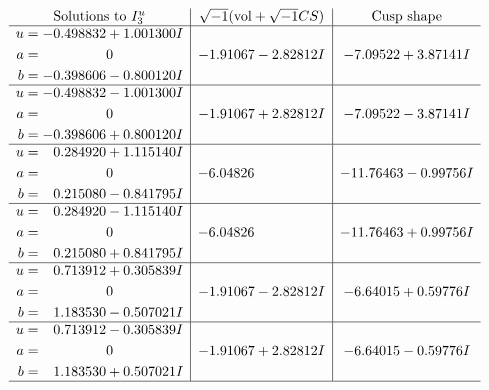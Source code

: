 \documentclass[1p]{elsarticle_modified}
\theoremstyle{definition}
\newcommand{\I}{\sqrt{-1}}
\begin{document}
$$\begin{array}{c|c|c}  
\text{Solutions to }I^u_{3}& \I (\text{vol} + \sqrt{-1}CS) & \text{Cusp shape}\\
 \hline 
\begin{aligned}
u &= -0.498832 + 1.001300 I \\
a &= \phantom{-0.000000 } 0 \\
b &= -0.398606 - 0.800120 I\end{aligned}
 & -1.91067 - 2.82812 I & -7.09522 + 3.87141 I \\ \hline\begin{aligned}
u &= -0.498832 - 1.001300 I \\
a &= \phantom{-0.000000 } 0 \\
b &= -0.398606 + 0.800120 I\end{aligned}
 & -1.91067 + 2.82812 I & -7.09522 - 3.87141 I \\ \hline\begin{aligned}
u &= \phantom{-}0.284920 + 1.115140 I \\
a &= \phantom{-0.000000 } 0 \\
b &= \phantom{-}0.215080 - 0.841795 I\end{aligned}
 & -6.04826\phantom{ +0.000000I} & -11.76463 - 0.99756 I \\ \hline\begin{aligned}
u &= \phantom{-}0.284920 - 1.115140 I \\
a &= \phantom{-0.000000 } 0 \\
b &= \phantom{-}0.215080 + 0.841795 I\end{aligned}
 & -6.04826\phantom{ +0.000000I} & -11.76463 + 0.99756 I \\ \hline\begin{aligned}
u &= \phantom{-}0.713912 + 0.305839 I \\
a &= \phantom{-0.000000 } 0 \\
b &= \phantom{-}1.183530 - 0.507021 I\end{aligned}
 & -1.91067 - 2.82812 I & -6.64015 + 0.59776 I \\ \hline\begin{aligned}
u &= \phantom{-}0.713912 - 0.305839 I \\
a &= \phantom{-0.000000 } 0 \\
b &= \phantom{-}1.183530 + 0.507021 I\end{aligned}
 & -1.91067 + 2.82812 I & -6.64015 - 0.59776 I\\
 \hline 
 \end{array}$$\newpage\newpage\renewcommand{\arraystretch}{1}
\end{document}
